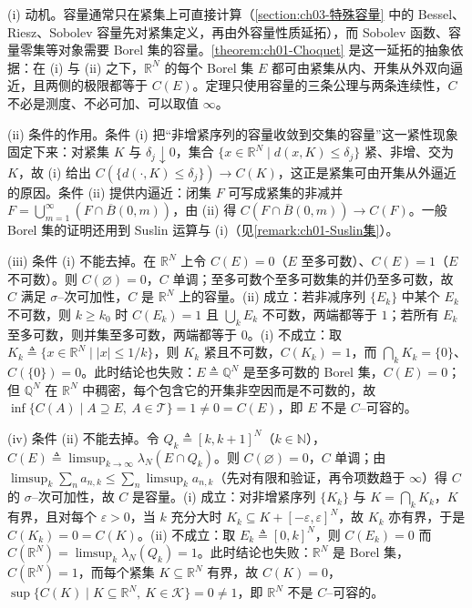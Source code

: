 \documentclass[../../main.tex]{subfiles}%
\begin{document}
\begin{remark}\label{remark:ch01-Choquet动机}
(i) 动机。容量通常只在紧集上可直接计算（\cref{section:ch03-特殊容量} 中的 Bessel、Riesz、Sobolev 容量先对紧集定义，再由外容量性质延拓），而 Sobolev 函数、容量零集等对象需要 Borel 集的容量。\cref{theorem:ch01-Choquet} 是这一延拓的抽象依据：在 (i) 与 (ii) 之下，$\mathbb{R}^N$ 的每个 Borel 集 $E$ 都可由紧集从内、开集从外双向逼近，且两侧的极限都等于 $C(E)$。定理只使用容量的三条公理与两条连续性，$C$ 不必是测度、不必可加、可以取值 $\infty$。

(ii) 条件的作用。条件 (i) 把“非增紧序列的容量收敛到交集的容量”这一紧性现象固定下来：对紧集 $K$ 与 $\delta_j\downarrow0$，集合 $\{x\in\mathbb{R}^N\mid d(x,K)\leqslant\delta_j\}$ 紧、非增、交为 $K$，故 (i) 给出 $C(\{d(\cdot,K)\leqslant\delta_j\})\to C(K)$，这正是紧集可由开集从外逼近的原因。条件 (ii) 提供内逼近：闭集 $F$ 可写成紧集的非减并 $F=\bigcup_{m=1}^\infty(F\cap\overline{B}(0,m))$，由 (ii) 得 $C(F\cap\overline{B}(0,m))\to C(F)$。一般 Borel 集的证明还用到 Suslin 运算与 (i)（见\cref{remark:ch01-Suslin集}）。

(iii) 条件 (i) 不能去掉。在 $\mathbb{R}^N$ 上令 $C(E)=0$（$E$ 至多可数）、$C(E)=1$（$E$ 不可数）。则 $C(\varnothing)=0$，$C$ 单调；至多可数个至多可数集的并仍至多可数，故 $C$ 满足 $\sigma$--次可加性，$C$ 是 $\mathbb{R}^N$ 上的容量。(ii) 成立：若非减序列 $\{E_k\}$ 中某个 $E_k$ 不可数，则 $k\geqslant k_0$ 时 $C(E_k)=1$ 且 $\bigcup_kE_k$ 不可数，两端都等于 $1$；若所有 $E_k$ 至多可数，则并集至多可数，两端都等于 $0$。(i) 不成立：取 $K_k\triangleq\{x\in\mathbb{R}^N\mid|x|\leqslant1/k\}$，则 $K_k$ 紧且不可数，$C(K_k)=1$，而 $\bigcap_kK_k=\{0\}$、$C(\{0\})=0$。此时结论也失败：$E\triangleq\mathbb{Q}^N$ 是至多可数的 Borel 集，$C(E)=0$；但 $\mathbb{Q}^N$ 在 $\mathbb{R}^N$ 中稠密，每个包含它的开集非空因而是不可数的，故 $\inf\{C(A)\mid A\supseteq E,\ A\in\mathcal{T}\}=1\neq0=C(E)$，即 $E$ 不是 $C$--可容的。

(iv) 条件 (ii) 不能去掉。令 $Q_k\triangleq[k,k+1]^N$（$k\in\mathbb{N}$），$C(E)\triangleq\limsup_{k\to\infty}\lambda_N(E\cap Q_k)$。则 $C(\varnothing)=0$，$C$ 单调；由 $\limsup_k\sum_na_{n,k}\leqslant\sum_n\limsup_ka_{n,k}$（先对有限和验证，再令项数趋于 $\infty$）得 $C$ 的 $\sigma$--次可加性，故 $C$ 是容量。(i) 成立：对非增紧序列 $\{K_k\}$ 与 $K=\bigcap_kK_k$，$K$ 有界，且对每个 $\varepsilon>0$，当 $k$ 充分大时 $K_k\subseteq K+[-\varepsilon,\varepsilon]^N$，故 $K_k$ 亦有界，于是 $C(K_k)=0=C(K)$。(ii) 不成立：取 $E_k\triangleq[0,k]^N$，则 $C(E_k)=0$ 而 $C(\mathbb{R}^N)=\limsup_k\lambda_N(Q_k)=1$。此时结论也失败：$\mathbb{R}^N$ 是 Borel 集，$C(\mathbb{R}^N)=1$，而每个紧集 $K\subseteq\mathbb{R}^N$ 有界，故 $C(K)=0$，$\sup\{C(K)\mid K\subseteq\mathbb{R}^N,\ K\in\mathcal{K}\}=0\neq1$，即 $\mathbb{R}^N$ 不是 $C$--可容的。


\end{remark}
\end{document}
